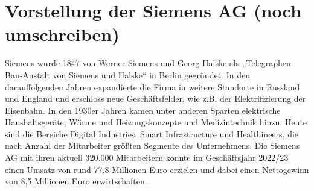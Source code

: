 \chapter{Vorstellung der Siemens AG (noch umschreiben)}\label{ch:data}

\label{sec:Vorstellung der Siemens AG (noch umschreiben)}

Siemens wurde 1847 von Werner Siemens und Georg Halske als „Telegraphen
Bau-Anstalt von Siemens und Halske“ in Berlin gegründet. In den darauffolgenden
Jahren expandierte die Firma in weitere Standorte in Russland und England und
erschloss neue Geschäftsfelder, wie z.B. der Elektrifizierung der Eisenbahn.
In den 1930er Jahren kamen unter anderen Sparten elektrische Haushaltsgeräte,
Wärme und Heizungskonzepte und Medizintechnik hinzu.
Heute sind die Bereiche Digital Industries, Smart Infrastructure und Healthineers,
die nach Anzahl der Mitarbeiter größten Segmente des Unternehmens.
Die Siemens AG mit ihren aktuell 320.000 Mitarbeitern konnte im Geschäftsjahr
2022/23 einen Umsatz von rund 77,8 Millionen Euro erzielen und dabei einen
Nettogewinn von 8,5 Millionen Euro erwirtschaften.

